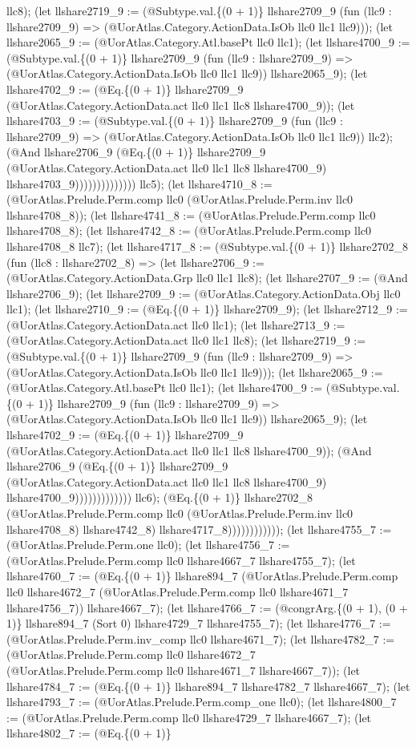 \documentclass[11pt]{article}
\begin{document}
llc8); (let llshare2719\_9 := (@Subtype.val.\{(0 + 1)\} llshare2709\_9 (fun (llc9 : llshare2709\_9) => (@UorAtlas.Category.ActionData.IsOb llc0 llc1 llc9))); (let llshare2065\_9 := (@UorAtlas.Category.Atl.basePt llc0 llc1); (let llshare4700\_9 := (@Subtype.val.\{(0 + 1)\} llshare2709\_9 (fun (llc9 : llshare2709\_9) => (@UorAtlas.Category.ActionData.IsOb llc0 llc1 llc9)) llshare2065\_9); (let llshare4702\_9 := (@Eq.\{(0 + 1)\} llshare2709\_9 (@UorAtlas.Category.ActionData.act llc0 llc1 llc8 llshare4700\_9)); (let llshare4703\_9 := (@Subtype.val.\{(0 + 1)\} llshare2709\_9 (fun (llc9 : llshare2709\_9) => (@UorAtlas.Category.ActionData.IsOb llc0 llc1 llc9)) llc2); (@And llshare2706\_9 (@Eq.\{(0 + 1)\} llshare2709\_9 (@UorAtlas.Category.ActionData.act llc0 llc1 llc8 llshare4700\_9) llshare4703\_9)))))))))))))) llc5); (let llshare4710\_8 := (@UorAtlas.Prelude.Perm.comp llc0 (@UorAtlas.Prelude.Perm.inv llc0 llshare4708\_8)); (let llshare4741\_8 := (@UorAtlas.Prelude.Perm.comp llc0 llshare4708\_8); (let llshare4742\_8 := (@UorAtlas.Prelude.Perm.comp llc0 llshare4708\_8 llc7); (let llshare4717\_8 := (@Subtype.val.\{(0 + 1)\} llshare2702\_8 (fun (llc8 : llshare2702\_8) => (let llshare2706\_9 := (@UorAtlas.Category.ActionData.Grp llc0 llc1 llc8); (let llshare2707\_9 := (@And llshare2706\_9); (let llshare2709\_9 := (@UorAtlas.Category.ActionData.Obj llc0 llc1); (let llshare2710\_9 := (@Eq.\{(0 + 1)\} llshare2709\_9); (let llshare2712\_9 := (@UorAtlas.Category.ActionData.act llc0 llc1); (let llshare2713\_9 := (@UorAtlas.Category.ActionData.act llc0 llc1 llc8); (let llshare2719\_9 := (@Subtype.val.\{(0 + 1)\} llshare2709\_9 (fun (llc9 : llshare2709\_9) => (@UorAtlas.Category.ActionData.IsOb llc0 llc1 llc9))); (let llshare2065\_9 := (@UorAtlas.Category.Atl.basePt llc0 llc1); (let llshare4700\_9 := (@Subtype.val.\{(0 + 1)\} llshare2709\_9 (fun (llc9 : llshare2709\_9) => (@UorAtlas.Category.ActionData.IsOb llc0 llc1 llc9)) llshare2065\_9); (let llshare4702\_9 := (@Eq.\{(0 + 1)\} llshare2709\_9 (@UorAtlas.Category.ActionData.act llc0 llc1 llc8 llshare4700\_9)); (@And llshare2706\_9 (@Eq.\{(0 + 1)\} llshare2709\_9 (@UorAtlas.Category.ActionData.act llc0 llc1 llc8 llshare4700\_9) llshare4700\_9))))))))))))) llc6); (@Eq.\{(0 + 1)\} llshare2702\_8 (@UorAtlas.Prelude.Perm.comp llc0 (@UorAtlas.Prelude.Perm.inv llc0 llshare4708\_8) llshare4742\_8) llshare4717\_8)))))))))))); (let llshare4755\_7 := (@UorAtlas.Prelude.Perm.one llc0); (let llshare4756\_7 := (@UorAtlas.Prelude.Perm.comp llc0 llshare4667\_7 llshare4755\_7); (let llshare4760\_7 := (@Eq.\{(0 + 1)\} llshare894\_7 (@UorAtlas.Prelude.Perm.comp llc0 llshare4672\_7 (@UorAtlas.Prelude.Perm.comp llc0 llshare4671\_7 llshare4756\_7)) llshare4667\_7); (let llshare4766\_7 := (@congrArg.\{(0 + 1), (0 + 1)\} llshare894\_7 (Sort 0) llshare4729\_7 llshare4755\_7); (let llshare4776\_7 := (@UorAtlas.Prelude.Perm.inv\_comp llc0 llshare4671\_7); (let llshare4782\_7 := (@UorAtlas.Prelude.Perm.comp llc0 llshare4672\_7 (@UorAtlas.Prelude.Perm.comp llc0 llshare4671\_7 llshare4667\_7)); (let llshare4784\_7 := (@Eq.\{(0 + 1)\} llshare894\_7 llshare4782\_7 llshare4667\_7); (let llshare4793\_7 := (@UorAtlas.Prelude.Perm.comp\_one llc0); (let llshare4800\_7 := (@UorAtlas.Prelude.Perm.comp llc0 llshare4729\_7 llshare4667\_7); (let llshare4802\_7 := (@Eq.\{(0 + 1)\} 
\end{document}
